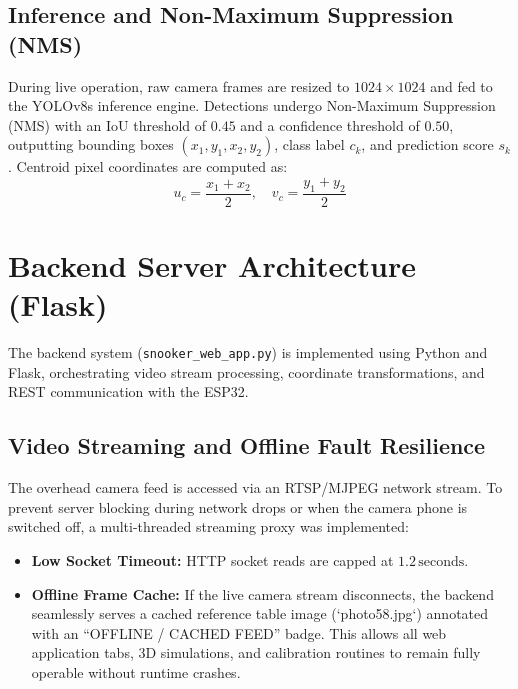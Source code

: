 \subsection{Inference and Non-Maximum Suppression (NMS)}
During live operation, raw camera frames are resized to $1024 \times 1024$ and fed to the YOLOv8s inference engine. Detections undergo Non-Maximum Suppression (NMS) with an IoU threshold of $0.45$ and a confidence threshold of $0.50$, outputting bounding boxes $(x_1, y_1, x_2, y_2)$, class label $c_k$, and prediction score $s_k$. Centroid pixel coordinates are computed as:
\begin{equation}
    u_c = \frac{x_1 + x_2}{2}, \quad v_c = \frac{y_1 + y_2}{2}
\end{equation}

\section{Backend Server Architecture (Flask)}
The backend system (\texttt{snooker\_web\_app.py}) is implemented using Python and Flask, orchestrating video stream processing, coordinate transformations, and REST communication with the ESP32.

\subsection{Video Streaming and Offline Fault Resilience}
The overhead camera feed is accessed via an RTSP/MJPEG network stream. To prevent server blocking during network drops or when the camera phone is switched off, a multi-threaded streaming proxy was implemented:
\begin{itemize}
    \item \textbf{Low Socket Timeout:} HTTP socket reads are capped at $1.2\,\text{seconds}$.
    \item \textbf{Offline Frame Cache:} If the live camera stream disconnects, the backend seamlessly serves a cached reference table image (`photo58.jpg`) annotated with an ``OFFLINE / CACHED FEED'' badge. This allows all web application tabs, 3D simulations, and calibration routines to remain fully operable without runtime crashes.
\end{itemize}

